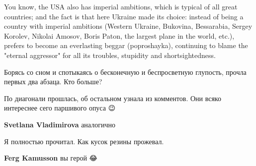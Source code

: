 \begin{itemize}
You know, the USA also has imperial ambitions, which is typical of all great
countries; and the fact is that here Ukraine made its choice: instead of being
a country with imperial ambitions (Western Ukraine, Bukovina, Bessarabia,
Sergey Korolev, Nikolai Amosov, Boris Paton, the largest plane in the world,
etc.), prefers to become an everlasting beggar (poproshayka), continuing to
blame the "eternal aggressor" for all its troubles, stupidity and
shortsightedness.


 

Борясь со сном и спотыкаясь о бесконечную и беспросветную глупость, прочла
первых два абзаца. Кто больше?

\begin{itemize}
 
По диагонали прошлась, об остальном узнала из комментов. Они всяко интереснее сего паршивого опуса 😉

 
\textbf{Svetlana Vladimirova} аналогично

 
Я полностью прочитал. Как кусок резины прожевал.

 
\textbf{Ferg Kamusson} вы герой 😂


\end{itemize}
\end{itemize}
